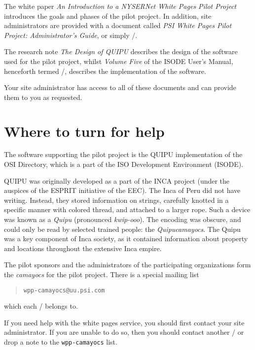 The white paper
{\em An Introduction to a NYSERNet White Pages Pilot Project\/}
introduces the goals and phases of the pilot project.
In addition,
site administrators are provided with a document called
{\em PSI White Pages Pilot Project: Administrator's Guide},
or simply \theguide/.

The research note {\em The Design of QUIPU\/} describes the design of the
software used for the pilot project,
whilst {\em Volume Five\/} of the ISODE User's Manual,
henceforth termed \volfive/,
describes the implementation of the software.

Your site administrator has access to all of these documents and can provide
them to you as requested.

\newpage





\section	{Where to turn for help}
The software supporting the pilot project is the QUIPU implementation
of the OSI Directory,
which is a part of the ISO Development Environment (ISODE).

QUIPU was originally developed as a part of the INCA project
(under the auspices of the ESPRIT initiative of the EEC).
The Inca of Peru did not have writing.
Instead,
they stored information on strings,
carefully knotted in a specific manner with colored thread,
and attached to a larger rope.
Such a device was known as a {\em Quipu\/}
(pronounced {\em kwip-ooo}).
The encoding was obscure,
and could only be read by selected trained people:
the {\em Quipucamayocs}.
The Quipu was a key component of Inca society,
as it contained information about property and locations throughout
the extensive Inca empire.

The pilot sponsors and the administrators of the participating organizations
form the {\em camayocs\/} for the pilot project.
There is a special mailing list
\begin{quote}\small\begin{verbatim}
wpp-camayocs@uu.psi.com
\end{verbatim}\end{quote}
which each \camayoc/ belongs to.

If you need help with the white pages service,
you should first contact your site administrator.
If you are unable to do so,
then you should contact another \camayoc/ or drop a note to the
\verb"wpp-camayocs" list.
